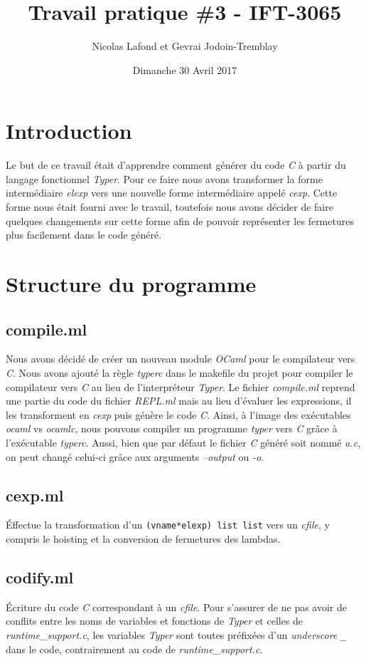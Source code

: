 \documentclass{article}
\begin{document}
\title{Travail pratique \#3 - IFT-3065}
\author{Nicolas Lafond et Gevrai Jodoin-Tremblay}
\date{Dimanche 30 Avril 2017}
\maketitle

\section{Introduction}
Le but de ce travail était d'apprendre comment générer du code \emph{C} à partir
du langage fonctionnel \emph{Typer}. Pour ce faire nous avons transformer la
forme intermédiaire \emph{elexp} vers une nouvelle forme intermédiaire appelé
\emph{cexp}. Cette forme nous était fourni avec le travail, toutefois nous avons
décider de faire quelques changements sur cette forme afin de pouvoir
représenter les fermetures plus facilement dans le code généré.

\section{Structure du programme}
\subsection{compile.ml}
Nous avons décidé de créer un nouveau module \emph{OCaml} pour le compilateur
vers \emph{C}.
Nous avons ajouté la règle \emph{typerc} dans le makefile du projet pour compiler
le compilateur vers \emph{C} au lieu de l'interpréteur \emph{Typer}. Le fichier
\emph{compile.ml}
reprend une partie du code du fichier \emph{REPL.ml} mais au lieu d'évaluer
les expressions, il les transforment en \emph{cexp} puis génère le 
code \emph{C}. Ainsi,
à l'image des exécutables \emph{ocaml} vs \emph{ocamlc}, nous pouvons compiler
un programme \emph{typer} vers \emph{C} grâce à l'exécutable \emph{typerc}.
Aussi, bien que par défaut le fichier \emph{C} généré soit nommé \emph{a.c},
on peut changé celui-ci grâce aux arguments \emph{--output} ou \emph{-o}.

\subsection{cexp.ml}
Éffectue la transformation d'un \texttt{(vname*elexp) list list} vers un
\emph{cfile}, y compris le hoisting et la conversion de fermetures des lambdas.

\subsection{codify.ml}
Écriture du code \emph{C} correspondant à un \emph{cfile}. Pour s'assurer de ne
pas avoir de conflits entre les noms de variables et fonctions de \emph{Typer}
et celles de \emph{runtime\_support.c}, les variables \emph{Typer} sont toutes
préfixées d'un \emph{underscore} \texttt{\_} dans le code, contrairement au code
de \emph{runtime\_support.c}.
\end{document}
